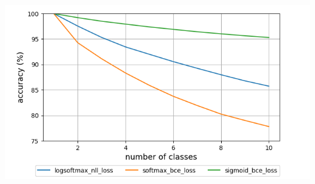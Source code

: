 \documentclass{article}
\begin{document}

\begin{table}[t]
    \mbox{}\hfill
    \begin{minipage}[c]{0.49\textwidth}
    \end{minipage}
    \hfill
    \begin{minipage}[c]{0.49\textwidth}
        \centering
        \includegraphics[scale=0.4,trim={0mm 0mm 0mm 0mm},clip]{mnist.png}
    \end{minipage}
    \hfill
    \mbox{}

    \caption{Accuracy of base model(left) and composed model with respect to number of classes(right)}
    \label{table:mnist_base}
\end{table}
\end{document}
